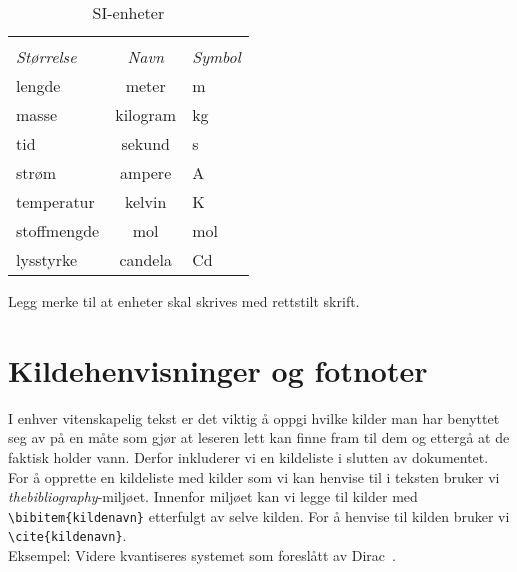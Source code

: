 \documentclass[a4paper,11pt]{article}
\begin{document}
\begin{table}[h!]
\centering
\caption{SI-enheter}

\begin{tabular}{l c l}
\hline \\[-4mm]
\emph{Størrelse} & \emph{Navn} & \emph{Symbol} \\
\hline
lengde      & meter    & m \\
masse       & kilogram & kg \\
tid         & sekund   & s \\
strøm       & ampere   & A \\
temperatur  & kelvin   & K \\
stoffmengde & mol      & mol \\
lysstyrke   & candela  & Cd \\ \hline
\end{tabular}
\label{tab:SI-enheter}
\end{table}

Legg merke til at enheter skal skrives med rettstilt skrift.

\section{Kildehenvisninger og fotnoter}
I enhver vitenskapelig tekst er det viktig å oppgi hvilke kilder man har benyttet seg av på en måte som gjør at leseren lett kan finne fram til dem og ettergå at de faktisk holder vann. Derfor inkluderer vi en kildeliste i slutten av dokumentet. For å opprette en kildeliste med kilder som vi kan henvise til i teksten bruker vi \emph{thebibliography}-miljøet. Innenfor miljøet kan vi legge til kilder med \texttt{\textbackslash bibitem\{kildenavn\}} etterfulgt av selve kilden. For å henvise til kilden bruker vi \texttt{\textbackslash cite\{kildenavn\}}.\\
Eksempel: Videre kvantiseres systemet som foreslått av Dirac~\cite{dirac}.
\end{document}
